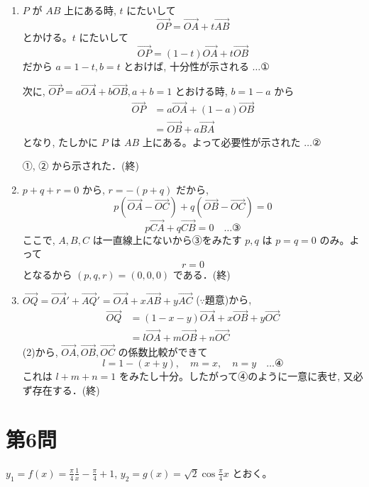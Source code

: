 \documentclass[../main.tex]{subfiles}
\begin{document}
\noindent
[\textbf{解}]
\begin{enumerate}
  \item[(1)] $P$ が $AB$ 上にある時, $t$ にたいして
    \[
      \vec{OP} = \vec{OA} + t \vec{AB}
    \]
    とかける。$t$ にたいして
    \[
      \vec{OP} = (1-t)\vec{OA} + t\vec{OB}
    \]
    だから $a = 1-t, b = t$ とおけば, 十分性が示される $\dots \text{①}$

    次に, $\vec{OP} = a\vec{OA} + b\vec{OB}, a+b=1$ とおける時, $b=1-a$ から
    \[
      \begin{aligned}
        \vec{OP} &= a\vec{OA} + (1-a)\vec{OB} \\
        &= \vec{OB} + a\vec{BA}
      \end{aligned}
    \]
    となり, たしかに $P$ は $AB$ 上にある。よって必要性が示された $\dots \text{②}$

    ①, ② から示された．(終)

  \item[(2)] $p+q+r=0$ から, $r=-(p+q)$ だから,
    \[
      p(\vec{OA} - \vec{OC}) + q(\vec{OB} - \vec{OC}) = 0
    \]
    \[
      p\vec{CA} + q\vec{CB} = 0 \quad \dots \text{③}
    \]
    ここで, $A, B, C$ は一直線上にないから③をみたす $p, q$ は $p=q=0$ のみ。よって
    \[
      r = 0
    \]
    となるから $(p, q, r) = (0, 0, 0)$ である．(終)

  \item[(3)] $\vec{OQ} = \vec{OA}' + \vec{AQ}' = \vec{OA} + x\vec{AB} + y\vec{AC}$ ($\because$題意)から,
    \[
      \begin{aligned}
        \vec{OQ} &= (1-x-y)\vec{OA} + x\vec{OB} + y\vec{OC} \\
        &= l\vec{OA} + m\vec{OB} + n\vec{OC}
      \end{aligned}
    \]
    (2)から, $\vec{OA}, \vec{OB}, \vec{OC}$ の係数比較ができて
    \[
      l = 1-(x+y), \quad m = x, \quad n = y \quad \dots \text{④}
    \]
    これは $l+m+n = 1$ をみたし十分。したがって④のように一意に表せ, 又必ず存在する．(終)
\end{enumerate}

\newpage

\section*{第6問}

\noindent
[\textbf{解}] $y_1 = f(x) = \frac{\pi}{4}\frac{1}{x} - \frac{\pi}{4} + 1$, $y_2 = g(x) = \sqrt{2}\cos \frac{\pi}{4}x$ とおく。
\end{document}
